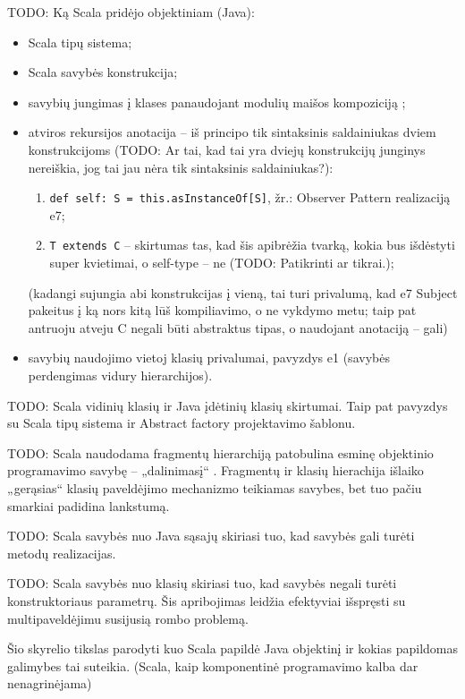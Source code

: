 TODO: Ką Scala pridėjo objektiniam (Java):
\begin{itemize}
  \item Scala tipų sistema;
  \item Scala savybės  konstrukcija;
  \item savybių jungimas į klases panaudojant modulių maišos
    kompoziciją ;
  \item atviros rekursijos anotacija  –
    iš principo tik sintaksinis saldainiukas dviem konstrukcijoms
    (TODO: Ar tai, kad tai yra dviejų konstrukcijų junginys nereiškia,
    jog tai jau nėra tik sintaksinis saldainiukas?):
    \begin{enumerate}
      \item \verb|def self: S = this.asInstanceOf[S]|, žr.: Observer
        Pattern realizaciją e7;
      \item \verb|T extends C| – skirtumas tas, kad šis apibrėžia
        tvarką, kokia bus išdėstyti super kvietimai, o self-type
        – ne (TODO: Patikrinti ar tikrai.);
    \end{enumerate}
    (kadangi sujungia abi konstrukcijas į vieną, tai turi privalumą, kad
    e7 Subject pakeitus į ką nors kitą lūš kompiliavimo, o ne vykdymo
    metu; taip pat antruoju atveju C negali būti abstraktus tipas, o
    naudojant anotaciją – gali)
  \item savybių naudojimo vietoj klasių privalumai, pavyzdys e1
    (savybės perdengimas vidury hierarchijos).
\end{itemize}

TODO: Scala vidinių klasių ir Java įdėtinių klasių skirtumai. Taip pat
pavyzdys su Scala tipų sistema ir Abstract factory projektavimo šablonu.

TODO: Scala naudodama fragmentų hierarchiją patobulina esminę objektinio
programavimo savybę – „dalinimasį“ . Fragmentų ir klasių
hierachija išlaiko „gerąsias“ klasių paveldėjimo mechanizmo teikiamas
savybes, bet tuo pačiu smarkiai padidina lankstumą.

TODO: Scala savybės nuo Java sąsajų skiriasi tuo, kad savybės gali turėti
metodų realizacijas.

TODO: Scala savybės nuo klasių skiriasi tuo, kad savybės negali turėti
konstruktoriaus parametrų. Šis apribojimas leidžia efektyviai
išspręsti su multipaveldėjimu susijusią rombo problemą.

Šio skyrelio tikslas parodyti kuo Scala papildė Java objektinį ir
kokias papildomas galimybes tai suteikia. (Scala, kaip komponentinė
programavimo kalba dar nenagrinėjama)

